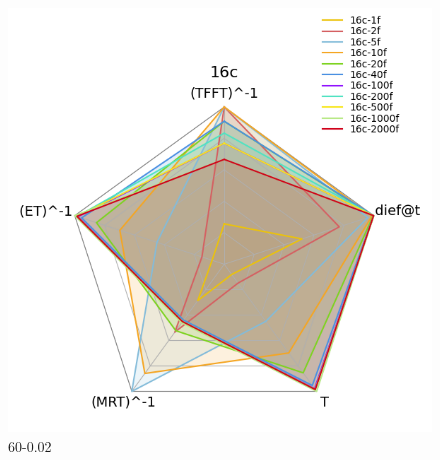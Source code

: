 \documentclass[12pt,a4paper]{article}
\begin{document}
\begin{figure}[H]
{\begin{minipage}{0.5\textwidth}
            \includegraphics[scale=0.6]{../processed/NRT/small/checks/60-0.02/fixedcores/16c/plots/radar-dieft.png}
            \caption*{60-0.02}
        \end{minipage}
    }
    
    \vspace{0.5cm} %



\end{figure}
\end{document}
